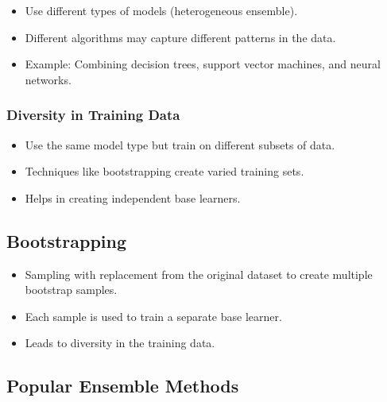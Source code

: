 \documentclass{article}
\begin{document}
\begin{itemize}
    \item Use different types of models (heterogeneous ensemble).
    \item Different algorithms may capture different patterns in the data.
    \item Example: Combining decision trees, support vector machines, and neural networks.
\end{itemize}

\subsubsection{Diversity in Training Data}

\begin{itemize}
    \item Use the same model type but train on different subsets of data.
    \item Techniques like bootstrapping create varied training sets.
    \item Helps in creating independent base learners.
\end{itemize}

\subsection{Bootstrapping}

\begin{itemize}
    \item Sampling with replacement from the original dataset to create multiple bootstrap samples.
    \item Each sample is used to train a separate base learner.
    \item Leads to diversity in the training data.
\end{itemize}

\subsection{Popular Ensemble Methods}
\end{document}
